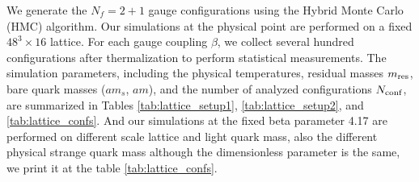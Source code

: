 We generate the $N_f=2+1$ gauge configurations using the Hybrid Monte Carlo (HMC) algorithm. Our simulations at the physical point are performed on a fixed $48^3 \times 16$ lattice. For each gauge coupling $\beta$, we collect several hundred configurations after thermalization to perform statistical measurements. The simulation parameters, including the physical temperatures, residual masses $m_{\rm res}$, bare quark masses ($am_s$, $am$), and the number of analyzed configurations $N_{\rm conf}$, are summarized in Tables \ref{tab:lattice_setup1}, \ref{tab:lattice_setup2}, and \ref{tab:lattice_confs}.  And our simulations at the fixed beta parameter 4.17 are performed on different scale lattice and light quark mass, also the different physical strange quark mass although the dimensionless parameter is the same, we print it at the table \ref{tab:lattice_confs}.

\begin{table}[H]
\centering
\renewcommand{\arraystretch}{1.2}
\small
{}
\caption{Temperatures and corresponding residual masses for the physical point ensembles.}
\label{tab:lattice_setup1}
\end{table}

\begin{table}[H]
\centering
\renewcommand{\arraystretch}{1.2}
\small
{}
\caption{Bare quark masses for the strange and light quarks across simulated $\beta$ values.}
\label{tab:lattice_setup2}
\end{table}

\begin{table}[H]
\centering
\renewcommand{\arraystretch}{1.2}
\small
{}
\caption{Number of analyzed gauge configurations ($N_{\mathrm{conf}}$) and total measurement counts (using 16 sources per configuration) for each inverse coupling $\beta$ and temperature $T$.}
\label{tab:lattice_confs}
\end{table}


